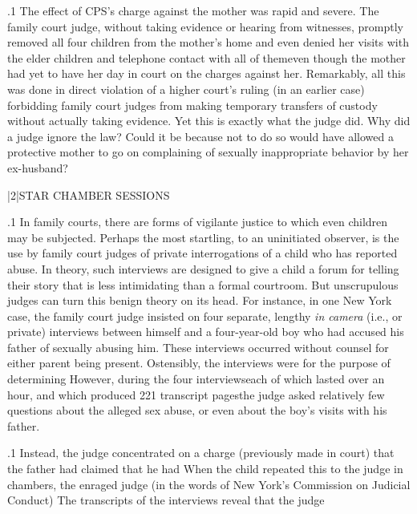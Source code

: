 \documentclass[11pt, twoside]{article}
\begin{document}
{\p.1{%
The effect of CPS’s charge against the mother was rapid and severe.
The family court judge, without taking evidence or hearing from witnesses, promptly removed all four children from the mother’s home and
even denied her visits with the elder children and telephone contact
with all of them\mdash{}even though the mother had yet to have her day in
court on the charges against her. Remarkably, all this was done in
direct violation of a higher court’s ruling (in an earlier case) forbidding family court judges from making temporary transfers of custody
without actually taking evidence. Yet this is exactly what the judge
did. Why did a judge ignore the law? Could it be because not to do so
would have allowed a protective mother to go on complaining of sexually
inappropriate behavior by her ex-husband?
}%


\s|2|{STAR CHAMBER SESSIONS}

\p.1{%
\noindent{}In family courts, there are forms of vigilante justice to which even children may be subjected. Perhaps the most startling, to an uninitiated
observer, is the use by family court judges of private interrogations of a
child who has reported abuse. In theory, such interviews are designed
to give a child a forum for telling their story that is less intimidating
than a formal courtroom. But unscrupulous judges can turn this benign
theory on its head. For instance, in one New York case, the family court
judge insisted on four separate, lengthy \textit{in camera} (i.e., 
or private) interviews between himself and a four-year-old boy who had
accused his father of sexually abusing him. These interviews occurred
without counsel for either parent being present. Ostensibly, the interviews were for the purpose of determining  However, during the four interviews\mdash{}each of which lasted over
an hour, and which produced 221 transcript pages\mdash{}the judge asked relatively few questions about the alleged sex abuse, or even about the boy’s
visits with his father.
}%

\p.1{%
Instead, the judge concentrated on a charge (previously made in
court) that the father had claimed that he had  When the child repeated this to the judge in chambers, the
enraged judge (in the words of New York’s Commission on Judicial
Conduct)  The transcripts of
the interviews reveal that the judge 
}%

}
\end{document}
